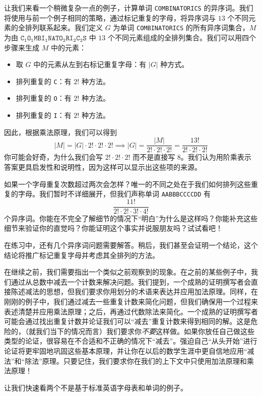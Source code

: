 \begin{example}
    让我们来看一个稍微复杂一点的例子，计算单词 \verb|COMBINATORICS| 的异序词。我们将使用与前一个例子相同的策略，通过标记重复的字母，将异序词与 $13$ 个不同元素的全排列联系起来。我们定义 $G$ 为单词 \verb|COMBINATORICS| 的所有异序词集合，$M$ 为由 ${\mathtt{C_1O_1MBI_1NATO_2RI_2C_2S}}$ 中 $13$ 个不同元素组成的全排列集合。我们可以用四个步骤来生成 $M$ 中的元素：
    \begin{itemize}
        \item 取 $G$ 中的元素从左到右标记重复字母：有 $|G|$ 种方式。
        \item 排列重复的 \verb|C|：有 $2!$ 种方法。
        \item 排列重复的 \verb|O|：有 $2!$ 种方法。
        \item 排列重复的 \verb|I|：有 $2!$ 种方法。
    \end{itemize}
    因此，根据乘法原理，我们可以得到
    \[|M| = |G| \cdot 2! \cdot 2! \cdot 2! \implies |G| = \frac{|M|}{2! \cdot 2! \cdot 2!} = \frac{13!}{2! \cdot 2! \cdot 2!}\]
    你可能会好奇，为什么我们会写 $2! \cdot 2! \cdot 2!$ 而不是直接写 $8$。我们认为用阶乘表示答案更具启发性和说明性，因为这样可以显示出这些项的来源。

    如果一个字母重复次数超过两次会怎样？唯一的不同之处在于我们如何排列这些重复的字母。我们暂时不详细展开，但我们声称单词 \verb|AABBBCCCCDD| 有
    \[\frac{11!}{2! \cdot 2! \cdot 3! \cdot 4!}\]
    个异序词。你能在不完全了解细节的情况下``明白''为什么是这样吗？你能补充这些细节来验证你的直觉吗？你能证明这个事实并说服朋友吗？试试看吧！
\end{example}

在练习中，还有几个异序词问题需要解答。稍后，我们甚至会证明一个结论，这个结论将推广标记重复字母并考虑其全排列的方法。

在继续之前，我们需要指出一个类似之前观察到的现象。在之前的某些例子中，我们通过从总数中减去一个计数来解决问题。我们提到，一个成熟的证明撰写者会直接陈述减法的思想，但我们要求你用划分的术语来表达并应用加法原理。同样，在刚刚的例子中，我们通过减去一些重复计数来简化问题，但我们确保用一个过程来表述清楚并应用乘法原理；之后，再通过代数除法来简化。一个成熟的证明撰写者可能会通过找出重复计数并论证我们可以``减去''重复计数来得到相同的解。这是危险的，（就我们当下的情况而言）我们要求你\emph{不要}这样做。如果你放任自己做这些类型的论证，很容易在不合适和不正确的情况下``减去''。强迫自己``从头开始''进行论证将更牢固地巩固这些基本原理，并让你在以后的数学生涯中更自信地应用``减法''和``除法''原理。只要记住，我们要求你在我们的上下文中只使用加法原理和乘法原理！

让我们快速看两个不是基于标准英语字母表和单词的例子。\\

